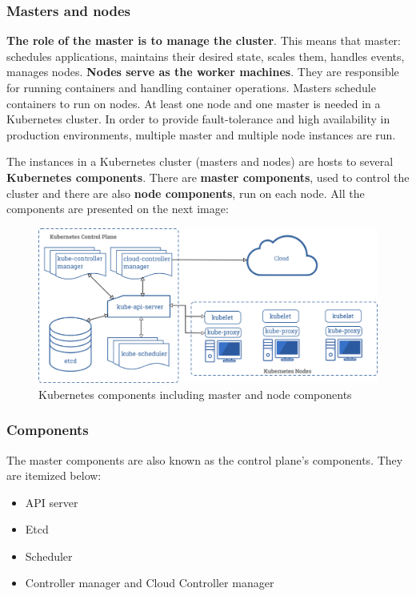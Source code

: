 \subsubsection{Masters and nodes}
\textbf{The role of the master is to manage the cluster}. This means that master: schedules applications, maintains their desired state, scales them, handles events, manages nodes. \textbf{Nodes serve as the worker machines}. They are responsible for running containers and handling container operations. Masters schedule containers to run on nodes\cite{book-mastering-k8s}\cite{k8s-cluster}. At least one node and one master is needed in a Kubernetes cluster. In order to provide fault-tolerance and high availability in production environments, multiple master and multiple node instances are run\cite{k8s-components}.

The instances in a Kubernetes cluster (masters and nodes) are hosts to several \textbf{Kubernetes components}. There are \textbf{master components}, used to control the cluster and there are also \textbf{node components}, run on each node. All the components are presented on the next image:
\begin{figure}[H]
    \centering
    \includegraphics[width=14cm]{figures/components-of-kubernetes.png}
    \caption{Kubernetes components including master and node components\cite{k8s-components}}
\end{figure}


\subsubsection{Components}
The master components are also known as the control plane’s components. They are itemized below\cite{book-mastering-k8s}\cite{k8s-components}:
\begin{itemize}
\item API server
\item Etcd
\item Scheduler
\item Controller manager and Cloud Controller manager
\end{itemize}

